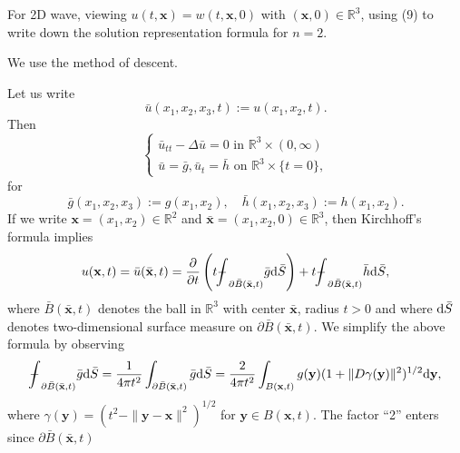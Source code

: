 \begin{pro}
  For 2D wave,
  viewing $u(t, \mathbf{x})=w(t, \mathbf{x}, 0)$ with $(\mathbf{x}, 0)\in\mathbb{R}^3$,
  using (9) to write down the solution representation formula for $n=2$.
\end{pro}
\begin{sol}
  We use the method of descent.

  Let us write
  \begin{displaymath}
    \bar{u}(x_1, x_2, x_3, t) := u(x_1, x_2, t).
  \end{displaymath}
  Then
  \begin{displaymath}
    \begin{cases}
      \bar{u}_{tt} - \Delta\bar{u} = 0 \text{ in } \mathbb{R}^3\times(0, \infty) \\
      \bar{u} = \bar{g}, \bar{u}_t = \bar{h} \text{ on } \mathbb{R}^3\times\{t=0\},
    \end{cases}
  \end{displaymath}
  for
  \begin{displaymath}
    \bar{g}(x_1, x_2, x_3) := g(x_1, x_2), \quad
    \bar{h}(x_1, x_2, x_3) := h(x_1, x_2).
  \end{displaymath}
  If we write $\mathbf{x}=(x_1, x_2)\in\mathbb{R}^2$ and
  $\bar{\mathbf{x}} = (x_1, x_2, 0)\in\mathbb{R}^3$,
  then Kirchhoff's formula implies
  \begin{displaymath}
    u(\mathbf{x}, t) = \bar{u}(\bar{\mathbf{x}}, t) =
    \frac{\partial}{\partial t}\LP t\bbint_{\partial \bar{B}(\bar{\mathbf{x}}, t)}\bar{g}
    \dif\bar{S}\RP + t\bbint_{\partial\bar{B}(\bar{\mathbf{x}}, t)}\bar{h}\dif\bar{S},
  \end{displaymath}
  where $\bar{B}(\bar{\mathbf{x}}, t)$ denotes the ball in $\mathbb{R}^3$
  with center $\bar{\mathbf{x}}$, radius $t>0$ and
  where $\mathrm{d}\bar{S}$ denotes two-dimensional surface measure on $\partial\bar{B}(\bar{\mathbf{x}}, t)$.
  We simplify the above formula by observing
  \begin{displaymath}
    \bbint_{\partial\bar{B}(\bar{\mathbf{x}}, t)}\bar{g}\dif\bar{S} =
    \frac{1}{4\pi t^2}\int_{\partial\bar{B}(\bar{\mathbf{x}}, t)}\bar{g}\dif\bar{S}
    = \frac{2}{4\pi t^2}\int_{B(\mathbf{x}, t)}g(\mathbf{y})(1+\|D\gamma(\mathbf{y})\|^2)^{1/2}\dif\mathbf{y},
  \end{displaymath}
  where $\gamma(\mathbf{y}) = (t^2-\|\mathbf{y}-\mathbf{x}\|^2)^{1/2}$
  for $\mathbf{y}\in B(\mathbf{x}, t)$.
  The factor ``2'' enters since $\partial \bar{B}(\bar{\mathbf{x}}, t)$

\end{sol}
